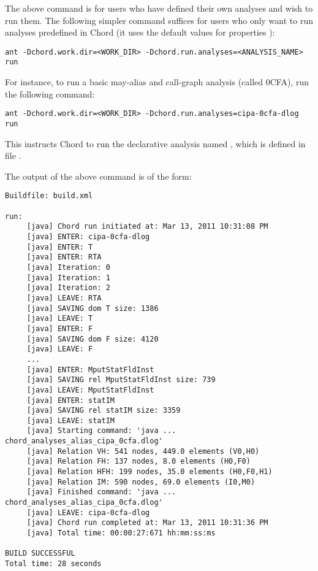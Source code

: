 The above command is for users who have defined their own analyses and wish to run them.
The following simpler command suffices for users who only want to run analyses predefined
in Chord (it uses the default values for properties ):

\begin{framed}
\begin{verbatim}
ant -Dchord.work.dir=<WORK_DIR> -Dchord.run.analyses=<ANALYSIS_NAME> run
\end{verbatim}
\end{framed}

For instance, to run a basic may-alias and call-graph analysis (called 0CFA),
run the following command:

\begin{framed}
\begin{verbatim}
ant -Dchord.work.dir=<WORK_DIR> -Dchord.run.analyses=cipa-0cfa-dlog run
\end{verbatim}
\end{framed}

This instructs Chord to run the declarative analysis named ,
which is defined in file .

The output of the above command is of the form:

\begin{framed}
{\small
\begin{verbatim}
Buildfile: build.xml

run:
     [java] Chord run initiated at: Mar 13, 2011 10:31:08 PM
     [java] ENTER: cipa-0cfa-dlog
     [java] ENTER: T
     [java] ENTER: RTA
     [java] Iteration: 0
     [java] Iteration: 1
     [java] Iteration: 2
     [java] LEAVE: RTA
     [java] SAVING dom T size: 1386
     [java] LEAVE: T
     [java] ENTER: F
     [java] SAVING dom F size: 4120
     [java] LEAVE: F
     ...
     [java] ENTER: MputStatFldInst
     [java] SAVING rel MputStatFldInst size: 739
     [java] LEAVE: MputStatFldInst
     [java] ENTER: statIM
     [java] SAVING rel statIM size: 3359
     [java] LEAVE: statIM
     [java] Starting command: 'java ... chord_analyses_alias_cipa_0cfa.dlog'
     [java] Relation VH: 541 nodes, 449.0 elements (V0,H0)
     [java] Relation FH: 137 nodes, 8.0 elements (H0,F0)
     [java] Relation HFH: 199 nodes, 35.0 elements (H0,F0,H1)
     [java] Relation IM: 590 nodes, 69.0 elements (I0,M0)
     [java] Finished command: 'java ... chord_analyses_alias_cipa_0cfa.dlog'
     [java] LEAVE: cipa-0cfa-dlog
     [java] Chord run completed at: Mar 13, 2011 10:31:36 PM
     [java] Total time: 00:00:27:671 hh:mm:ss:ms

BUILD SUCCESSFUL
Total time: 28 seconds
\end{verbatim}
}
\end{framed}

